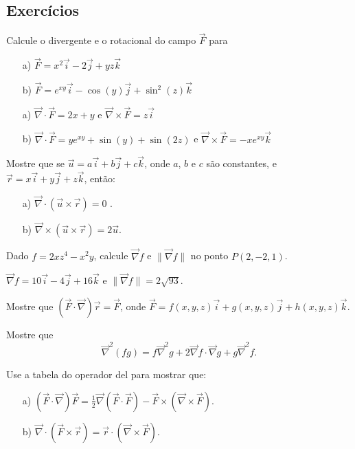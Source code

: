  \subsection*{Exercícios}
\begin{exer}
 Calcule o divergente e o rotacional do campo $\vec{F}$ para
 \begin{itemize}
  \item[a)] $\vec{F}=x^2\vec{i}-2\vec{j}+yz\vec{k}$
  \item[b)] $\vec{F}=e^{xy}\vec{i}-\cos(y)\vec{j}+\sin^2(z)\vec{k}$ 
 \end{itemize}
\end{exer}
\begin{resp}
 \begin{itemize}
  \item[a)] $\vec{\nabla}\cdot\vec{F}=2x+y$ e $\vec{\nabla}\times \vec{F}=z\vec{i}$
  \item[b)] $\vec{\nabla}\cdot\vec{F}=ye^{xy}+\sin(y)+\sin(2z)$ e $\vec{\nabla}\times \vec{F}=-xe^{xy}\vec{k}$
 \end{itemize}
\end{resp}

\begin{exer}
Mostre que se $\vec{u}=a\vec{i}+b\vec{j}+c\vec{k}$, onde $a$, $b$ e $c$ são constantes, e $\vec{r}=x\vec{i}+y\vec{j}+z\vec{k}$, então:
\begin{itemize}
 \item[a)] $\vec{\nabla}\cdot (\vec{u}\times \vec{r})=0$ .
 \item[b)] $\vec{\nabla}\times (\vec{u}\times \vec{r})=2\vec{u}$.
\end{itemize}
\end{exer}
\begin{exer} Dado $f=2xz^4-x^2y$, calcule $\vec{\nabla}f$ e $\|\vec{\nabla}f\|$ no ponto $P(2,-2,1)$.
\end{exer}
\begin{resp}
 $\vec{\nabla}f=10\vec{i}-4\vec{j}+16\vec{k}$ e $\|\vec{\nabla}f\|=2\sqrt{93}$.
\end{resp}
\begin{exer}
Mostre que $(\vec{F}\cdot\vec{\nabla})\vec{r}=\vec{F}$, onde $\vec{F}=f(x,y,z)\vec{i}+g(x,y,z)\vec{j}+h(x,y,z)\vec{k}$.
\end{exer}

\begin{exer}
 Mostre que
 $$
 \vec{\nabla}^2(fg)=f\vec{\nabla}^2g+2\vec{\nabla}f\cdot \vec{\nabla}g+g\vec{\nabla}^2f.
 $$
\end{exer}
\begin{exer}
 Use a  tabela do operador del para mostrar que:
 \begin{itemize}
  \item[a)] $(\vec{F}\cdot\vec{\nabla})\vec{F}=\frac{1}{2}\vec{\nabla}(\vec{F}\cdot\vec{F})-\vec{F}\times (\vec{\nabla}\times\vec{F})$.
  \item[b)] $\vec{\nabla}\cdot(\vec{F}\times\vec{r})=\vec{r}\cdot(\vec{\nabla}\times\vec{F})$.
 \end{itemize}
\end{exer}



